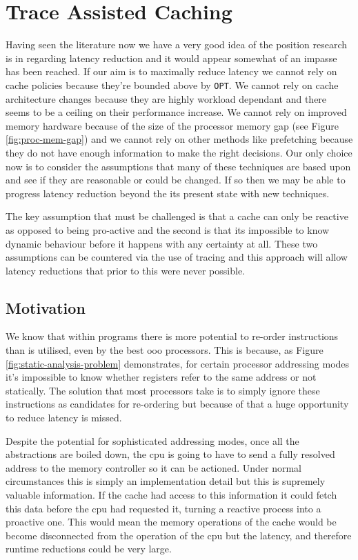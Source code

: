 \chapter{Trace Assisted Caching}
\label{chap:trace-assisted-caching}

Having seen the literature now we have a very good idea of the position research is in regarding latency reduction and it would appear somewhat of an impasse has been reached. If our aim is to maximally reduce latency we cannot rely on cache policies because they're bounded above by \texttt{OPT}. We cannot rely on cache architecture changes because they are highly workload dependant and there seems to be a ceiling on their performance increase. We cannot rely on improved memory hardware because of the size of the processor memory gap (see Figure \ref{fig:proc-mem-gap}) and we cannot rely on other methods like prefetching because they do not have enough information to make the right decisions. Our only choice now is to consider the assumptions that many of these techniques are based upon and see if they are reasonable or could be changed. If so then we may be able to progress latency reduction beyond the its present state with new techniques. 
	
The key assumption that must be challenged is that a cache can only be reactive as opposed to being pro-active and the second is that its impossible to know dynamic behaviour before it happens with any certainty at all. These two assumptions can be countered via the use of tracing and this approach will allow latency reductions that prior to this were never possible.

\section{Motivation}

We know that within programs there is more potential to re-order instructions than is utilised, even by the best \gls{ooo} processors. This is because, as Figure \ref{fig:static-analysis-problem} demonstrates, for certain processor addressing modes it's impossible to know whether registers refer to the same address or not statically. The solution that most processors take is to simply ignore these instructions as candidates for re-ordering but because of that a huge opportunity to reduce latency is missed. 

Despite the potential for sophisticated addressing modes, once all the abstractions are boiled down, the \gls{cpu} is going to have to send a fully resolved address to the memory controller so it can be actioned. Under normal circumstances this is simply an implementation detail but this is supremely valuable information. If the cache had access to this information it could fetch this data before the \gls{cpu} had requested it, turning a reactive process into a proactive one. This would mean the memory operations of the cache would be become disconnected from the operation of the \gls{cpu} but the latency, and therefore runtime reductions could be very large. 

